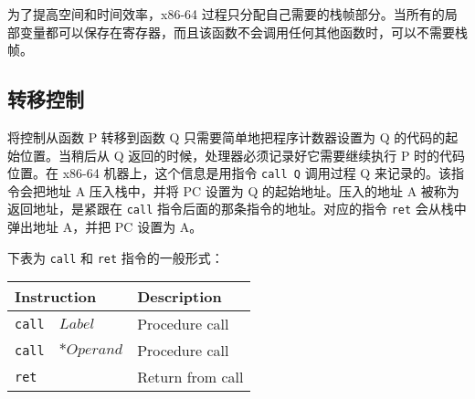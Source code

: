 为了提高空间和时间效率，x86-64 过程只分配自己需要的栈帧部分。当所有的局部变量都可以保存在寄存器，而且该函数不会调用任何其他函数时，可以不需要栈帧。

\subsection{转移控制}

将控制从函数 P 转移到函数 Q 只需要简单地把程序计数器设置为 Q 的代码的起始位置。当稍后从 Q 返回的时候，处理器必须记录好它需要继续执行 P 时的代码位置。在 x86-64 机器上，这个信息是用指令 \verb|call Q| 调用过程 Q 来记录的。该指令会把地址 A 压入栈中，并将 PC 设置为 Q 的起始地址。压入的地址 A 被称为返回地址，是紧跟在 \verb|call| 指令后面的那条指令的地址。对应的指令 \verb|ret| 会从栈中弹出地址 A，并把 PC 设置为 A。

下表为 \verb|call| 和 \verb|ret| 指令的一般形式：
\begin{table}[!ht]
    \centering
    \begin{tabular}{lll}
        \toprule
        \multicolumn{2}{l}{Instruction} & Description \\
        \midrule
        \texttt{call} & $Label$    & Procedure call \\
        \texttt{call} & $*Operand$ & Procedure call \\
        \texttt{ret}  &            & Return from call \\
        \bottomrule
    \end{tabular}
\end{table}

\endinput
